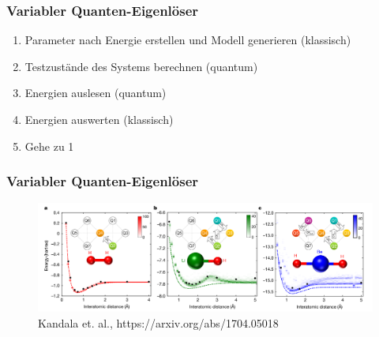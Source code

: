 \documentclass[aspectratio=169]{beamer}
\begin{document}
\begin{frame}
  \frametitle{Variabler Quanten-Eigenl\"oser}
  \begin{enumerate}
  \item Parameter nach Energie erstellen und Modell generieren (klassisch)
  \item Testzust\"ande des Systems berechnen (quantum)
  \item Energien auslesen (quantum)
  \item Energien auswerten (klassisch)
  \item Gehe zu 1
  \end{enumerate}
\end{frame}

\begin{frame}
  \frametitle{Variabler Quanten-Eigenl\"oser}
  \begin{figure}
  \centering
  \includegraphics[width=\textwidth]{pes}
  \caption{Kandala et. al., https://arxiv.org/abs/1704.05018}
  \end{figure}
\end{frame}
\end{document}
